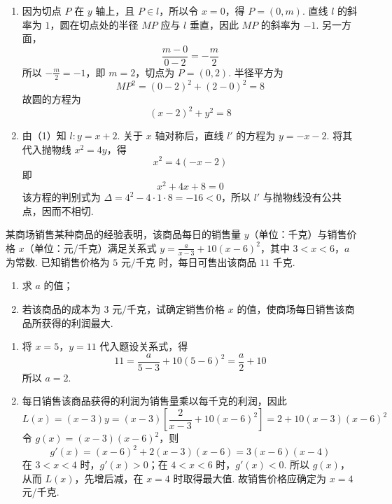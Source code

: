 \begin{solution}
\begin{enumerate}
\item 因为切点 \(P\) 在 \(y\) 轴上，且 \(P\in l\)，所以令 \(x=0\)，得 \(P=(0,m)\). 直线 \(l\) 的斜率为 \(1\)，圆在切点处的半径 \(MP\) 应与 \(l\) 垂直，因此 \(MP\) 的斜率为 \(-1\). 另一方面，
\[
\frac{m-0}{0-2}=-\frac{m}{2}
\]
所以 \(-\frac{m}{2}=-1\)，即 \(m=2\)，切点为 \(P=(0,2)\). 半径平方为
\[
MP^2=(0-2)^2+(2-0)^2=8
\]
故圆的方程为
\[
(x-2)^2+y^2=8
\]

\item 由（1）知 \(l:y=x+2\). 关于 \(x\) 轴对称后，直线 \(l'\) 的方程为 \(y=-x-2\). 将其代入抛物线 \(x^2=4y\)，得
\[
x^2=4(-x-2)
\]
即
\[
x^2+4x+8=0
\]
该方程的判别式为 \(\Delta=4^2-4\cdot1\cdot8=-16<0\)，所以 \(l'\) 与抛物线没有公共点，因而不相切.
\end{enumerate}
\end{solution}

\begin{problem}
某商场销售某种商品的经验表明，该商品每日的销售量 \(y\)（单位：千克）与销售价格 \(x\)（单位：元/千克）满足关系式 \(y=\frac{a}{x-3}+10(x-6)^2\)，其中 \(3<x<6\)，\(a\) 为常数. 已知销售价格为 \(5\text{ 元/千克}\) 时，每日可售出该商品 \(11\text{ 千克}\).

\begin{enumerate}
\item 求 \(a\) 的值；
\item 若该商品的成本为 \(3\text{ 元/千克}\)，试确定销售价格 \(x\) 的值，使商场每日销售该商品所获得的利润最大.
\end{enumerate}
\end{problem}

\begin{solution}
\begin{enumerate}
\item 将 \(x=5\)，\(y=11\) 代入题设关系式，得
\[
11=\frac{a}{5-3}+10(5-6)^2=\frac{a}{2}+10
\]
所以 \(a=2\).

\item 每日销售该商品获得的利润为销售量乘以每千克的利润，因此
\[
L(x)=(x-3)y=(x-3)\left[\frac{2}{x-3}+10(x-6)^2\right]
 =2+10(x-3)(x-6)^2
\]
令 \(g(x)=(x-3)(x-6)^2\)，则
\[
g'(x)=(x-6)^2+2(x-3)(x-6)=3(x-6)(x-4)
\]
在 \(3<x<4\) 时，\(g'(x)>0\)；在 \(4<x<6\) 时，\(g'(x)<0\). 所以 \(g(x)\)，从而 \(L(x)\)，先增后减，在 \(x=4\) 时取得最大值. 故销售价格应确定为 \(x=4\) 元/千克.
\end{enumerate}
\end{solution}

